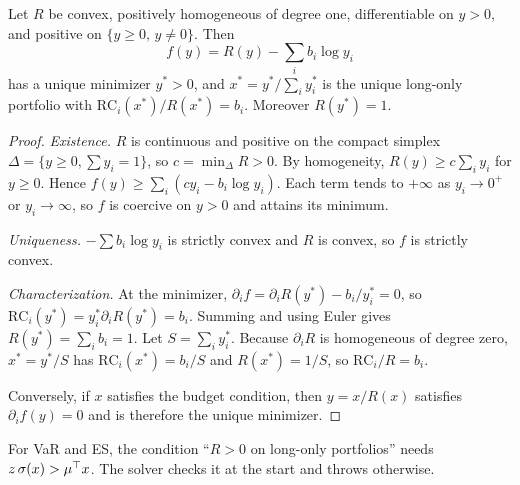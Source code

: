 \begin{theorem}\label{c:thm:rb}
Let $R$ be convex, positively homogeneous of degree one, differentiable on $y>0$, and
positive on $\{y\ge0,\,y\ne0\}$. Then
\[
  f(y)=R(y)-\sum_ib_i\log y_i
\]
has a unique minimizer $y^\ast>0$, and $x^\ast=y^\ast/\sum_iy^\ast_i$ is the unique long-only
portfolio with $\mathrm{RC}_i(x^\ast)/R(x^\ast)=b_i$. Moreover $R(y^\ast)=1$.
\end{theorem}
\begin{proof}
\emph{Existence.} $R$ is continuous and positive on the compact simplex
$\Delta=\{y\ge0,\sum y_i=1\}$, so $c=\min_\Delta R>0$. By homogeneity,
$R(y)\ge c\sum_iy_i$ for $y\ge0$. Hence $f(y)\ge\sum_i(cy_i-b_i\log y_i)$. Each term tends
to $+\infty$ as $y_i\to0^+$ or $y_i\to\infty$, so $f$ is coercive on $y>0$ and attains
its minimum.

\emph{Uniqueness.} $-\sum b_i\log y_i$ is strictly convex and $R$ is convex, so $f$ is
strictly convex.

\emph{Characterization.} At the minimizer, $\partial_if=\partial_iR(y^\ast)-b_i/y^\ast_i=0$,
so $\mathrm{RC}_i(y^\ast)=y^\ast_i\partial_iR(y^\ast)=b_i$. Summing and using Euler gives
$R(y^\ast)=\sum_ib_i=1$. Let $S=\sum_iy^\ast_i$. Because $\partial_iR$ is homogeneous of
degree zero, $x^\ast=y^\ast/S$ has $\mathrm{RC}_i(x^\ast)=b_i/S$ and $R(x^\ast)=1/S$, so
$\mathrm{RC}_i/R=b_i$.

Conversely, if $x$ satisfies the budget condition, then $y=x/R(x)$ satisfies
$\partial_if(y)=0$ and is therefore the unique minimizer.
\end{proof}

For VaR and ES, the condition ``$R>0$ on long-only portfolios'' needs
$z\,\sigma(x)>\mu^\top x$. The solver checks it at the start and throws otherwise.

